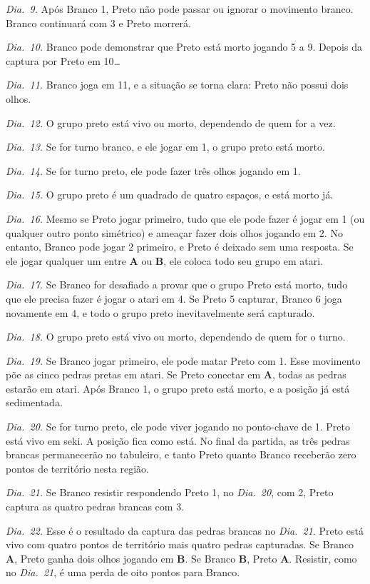 \emph{Dia.\@~9.} Após Branco 1, Preto não pode passar ou ignorar o movimento branco. Branco continuará com 3 e Preto morrerá.

\emph{Dia.\@~10.} Branco pode demonstrar que Preto está morto jogando 5 a 9. Depois da captura por Preto em 10\ldots

\emph{Dia.\@~11.} Branco joga em 11, e a situação se torna clara: Preto não possui dois olhos.

\emph{Dia.\@~12.} O grupo preto está vivo ou morto, dependendo de quem for a vez.

\emph{Dia.\@~13.} Se for turno branco, e ele jogar em 1, o grupo preto está morto.

\emph{Dia.\@~14.} Se for turno preto, ele pode fazer três olhos jogando em 1.

\emph{Dia.\@~15.} O grupo preto é um quadrado de quatro espaços, e está morto já.

\emph{Dia.\@~16.} Mesmo se Preto jogar primeiro, tudo que ele pode fazer é jogar em 1 (ou qualquer outro ponto simétrico) e ameaçar fazer dois olhos jogando em 2. No entanto, Branco pode jogar 2 primeiro, e Preto é deixado sem uma resposta. Se ele jogar qualquer um entre \textbf{A} ou \textbf{B}, ele coloca todo seu grupo em atari.

\emph{Dia.\@~17.} Se Branco for desafiado a provar que o grupo Preto está morto, tudo que ele precisa fazer é jogar o atari em 4. Se Preto 5 capturar, Branco 6 joga novamente em 4, e todo o grupo preto inevitavelmente será capturado.

\emph{Dia.\@~18.} O grupo preto está vivo ou morto, dependendo de quem for o turno.

\emph{Dia.\@~19.} Se Branco jogar primeiro, ele pode matar Preto com 1. Esse movimento põe as cinco pedras pretas em atari. Se Preto conectar em \textbf{A}, todas as pedras estarão em atari. Após Branco 1, o grupo preto está morto, e a posição já está sedimentada.

\emph{Dia.\@~20.} Se for turno preto, ele pode viver jogando no ponto-chave de 1. Preto está vivo em seki. A posição fica como está. No final da partida, as três pedras brancas permanecerão no tabuleiro, e tanto Preto quanto Branco receberão zero pontos de território nesta região.

\emph{Dia.\@~21.} Se Branco resistir respondendo Preto 1, no \emph{Dia.\@~20}, com 2, Preto captura as quatro pedras brancas com 3.

\emph{Dia.\@~22.} Esse é o resultado da captura das pedras brancas no \emph{Dia.\@~21}. Preto está vivo com quatro pontos de território mais quatro pedras capturadas. Se Branco \textbf{A}, Preto ganha dois olhos jogando em \textbf{B}. Se Branco \textbf{B}, Preto \textbf{A}. Resistir, como no \emph{Dia.\@~21}, é uma perda de oito pontos para Branco.

